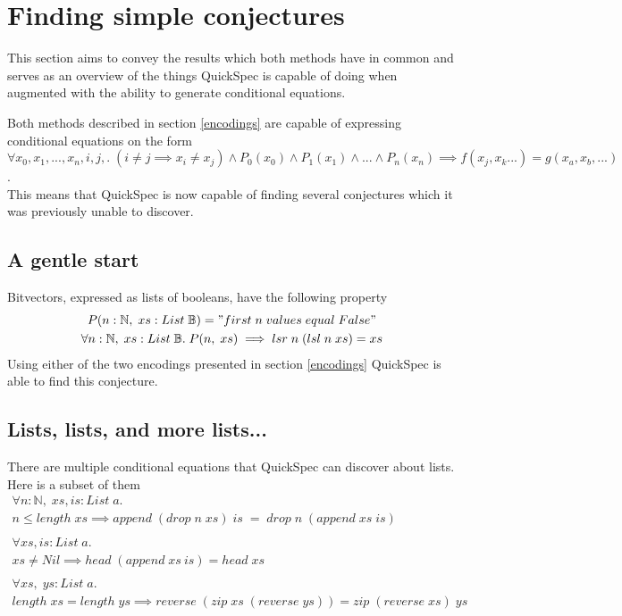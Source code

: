 \section{Finding simple conjectures}
This section aims to convey the results which
both  methods have in common and serves as an overview
of the things QuickSpec is capable of doing when augmented with
the ability to generate conditional equations.

Both methods described in section \ref{encodings}
are capable of expressing conditional equations on the form
\\$\forall x_0, x_1, ..., x_n, i, j,.\;(i \neq j \implies x_i \neq x_j)\wedge P_0(x_0) \wedge P_1(x_1) \wedge ... \wedge P_n(x_n) \implies f(x_j, x_k ...) = g(x_a, x_b, ...)$.\\
This means that QuickSpec is now capable of finding several
conjectures which it was previously unable to discover.

\subsection{A gentle start} \label{bitvector}
    Bitvectors, expressed as lists of booleans,
    have the following property
    \begin{gather*}
        P(n:\mathbb{N},\;xs:List\;\mathbb{B}) = "first\;n\;values\;equal\;False"\\
        \forall n:\mathbb{N},\;xs:List\;\mathbb{B}.\;P(n,\;xs)\implies lsr\;n\;(lsl\;n\;xs)=xs
    \end{gather*}
    Using either of the two encodings presented in section \ref{encodings} QuickSpec
    is able to find this conjecture.

\subsection{Lists, lists, and more lists...}
    There are multiple conditional equations that
    QuickSpec can discover about lists. Here is a subset of them
    \begin{gather*}
        \forall n:\mathbb{N},\; xs, is:List\; a.\\
        n \leq length\; xs \implies append\; (drop\; n\; xs)\; is\; =\; drop\; n\; (append\; xs\; is)\\\\
        \forall xs, is:List\; a.\\
        xs \neq Nil \implies head\; (append\; xs\: is) = head\; xs\\\\
        \forall xs,\; ys:List\; a.\\
        length\; xs = length\; ys \implies reverse\; (zip\; xs\; (reverse\; ys)) = zip\; (reverse\; xs)\; ys
    \end{gather*}

